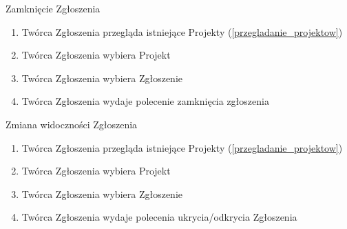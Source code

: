 \begin{usecase}{Zamknięcie Zgłoszenia}
	\begin{enumerate}
    \item Twórca Zgłoszenia przegląda istniejące Projekty (\ref{przegladanie_projektow})
    \item Twórca Zgłoszenia wybiera Projekt
    \item Twórca Zgłoszenia wybiera Zgłoszenie
    \item Twórca Zgłoszenia wydaje polecenie zamknięcia zgłoszenia
    \end{enumerate}
\end{usecase}


\begin{usecase}{Zmiana widoczności Zgłoszenia}
	\begin{enumerate}
    \item Twórca Zgłoszenia przegląda istniejące Projekty (\ref{przegladanie_projektow})
    \item Twórca Zgłoszenia wybiera Projekt
    \item Twórca Zgłoszenia wybiera Zgłoszenie
    \item Twórca Zgłoszenia wydaje polecenia ukrycia/odkrycia Zgłoszenia
	\end{enumerate}
\end{usecase}


